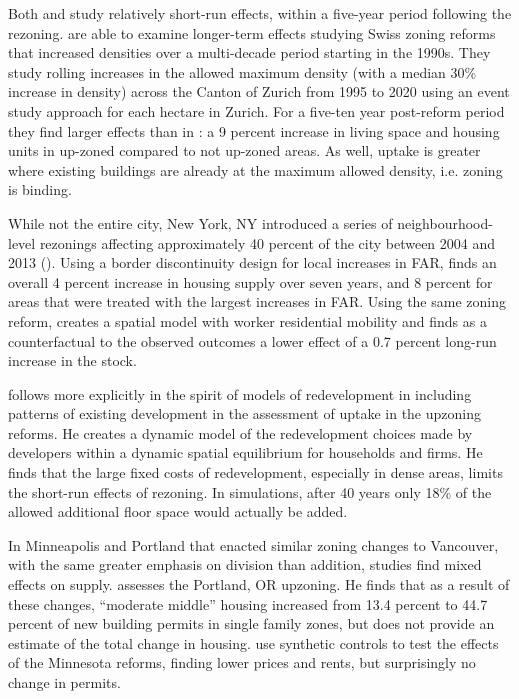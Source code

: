 \documentclass[12pt]{article}
\begin{document}
Both \textcite{Anagol_etal2021} and \textcite{GreenawayPhillips2023} study relatively short-run effects, within a five-year period following the rezoning. \textcite{BuchlerLutz2024} are able to examine longer-term effects studying Swiss zoning reforms that increased densities over a multi-decade period starting in the 1990s. They study rolling increases in the allowed maximum density (with a median 30\% increase in density) across the Canton of Zurich from 1995 to 2020 using an event study approach for each hectare in Zurich. For a five-ten year post-reform period they find larger effects than in \textcite{Anagol_etal2021}: a 9 percent increase in living space and housing units in up-zoned compared to not up-zoned areas. As well, uptake is greater where existing buildings are already at the maximum allowed density, i.e. zoning is binding. 

While not the entire city, New York, NY introduced a series of neighbourhood-level rezonings affecting approximately 40 percent of the city between 2004 and 2013 (\textcite{Liao2023}). Using a border discontinuity design for local increases in FAR, \textcite{Liao2023} finds an overall 4 percent increase in housing supply over seven years, and 8 percent for areas that were treated with the largest increases in FAR. Using the same zoning reform, \textcite{Peng2023} creates a spatial model with worker residential mobility and finds as a counterfactual to the observed outcomes a lower effect of a 0.7 percent long-run increase in the stock. 

\textcite{Rollet_2025} follows more explicitly in the spirit of models of redevelopment in including patterns of existing development in the assessment of uptake in the upzoning reforms. He creates a dynamic model of the redevelopment choices made by developers within a dynamic spatial equilibrium for households and firms. He finds that the large fixed costs of redevelopment, especially in dense areas, limits the short-run effects of rezoning. In simulations, after 40 years only 18\% of the allowed additional floor space would actually be added.  

In Minneapolis and Portland that enacted similar zoning changes to Vancouver, with the same greater emphasis on division than addition, studies find mixed effects on supply. \textcite{Dong2024a} assesses the Portland, OR upzoning. He finds that as a result of these changes, ``moderate middle'' housing increased from 13.4 percent to 44.7 percent of new building permits in single family zones, but does not provide an estimate of the total change in housing.\textcite{GuMunro_2025} use synthetic controls to test the effects of the Minnesota reforms, finding lower prices and rents, but surprisingly no change in permits.
\end{document}
